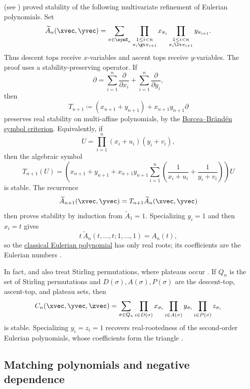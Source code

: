 \begin{example*}
\label{ex:stableMultivariateEulerianOperator}
 (see \cite[Thm. 2.5]{HaglundVisontai2012}) proved
stability of the following multivariate refinement of Eulerian polynomials.
Set
\[
 \widetilde A_n(\xvec,\yvec)
 =
 \sum_{\pi \in \symS_n}
 \prod_{\substack{1\leq i<n\\ \pi_i \gt \pi_{i+1}}} x_{\pi_i}
 \prod_{\substack{1\leq i<n\\ \pi_i \lt \pi_{i+1}}} y_{\pi_{i+1}}.
\]
Thus descent tops receive \(x\)-variables and ascent tops receive
\(y\)-variables.  The proof uses a stability-preserving operator.  If
\[
  \partial
  =
  \sum_{i=1}^n \frac{\partial}{\partial x_i}
  +
  \sum_{i=1}^n \frac{\partial}{\partial y_i},
\]
then
\[
  T_{n+1}
  \coloneqq
  (x_{n+1}+y_{n+1}) + x_{n+1}y_{n+1}\partial
\]
preserves real stability on multi-affine polynomials, by the
\hyperref[borceaBrandenFiniteSymbol]{Borcea--Brändén symbol criterion}.
Equivalently, if
\[
  U=\prod_{i=1}^n (x_i+u_i)(y_i+v_i),
\]
then the algebraic symbol
\[
  T_{n+1}(U)
  =
  \left(
    x_{n+1}+y_{n+1}
    +x_{n+1}y_{n+1}
    \sum_{i=1}^n
    \left(\frac{1}{x_i+u_i}+\frac{1}{y_i+v_i}\right)
  \right)U
\]
is stable.
The recurrence
\[
  \widetilde A_{n+1}(\xvec,\yvec)
  =
  T_{n+1}\widetilde A_n(\xvec,\yvec)
\]
then proves stability by induction from \(\widetilde A_1=1\).
Specializing \(y_i=1\) and then \(x_i=t\) gives
\[
  t\,\widetilde A_n(t,\dotsc,t;1,\dotsc,1)=A_n(t),
\]
so the \hyperref[eulerianZeros]{classical Eulerian polynomial} has only real
roots; its coefficients are the Eulerian numbers .

In fact,  and  also treat Stirling
permutations, where plateaus occur \cite{HaglundVisontai2012}.  If \(Q_n\) is
the set of Stirling permutations and \(D(\sigma),A(\sigma),P(\sigma)\) are the
descent-top, ascent-top, and plateau sets, then
\[
 C_n(\xvec,\yvec,\zvec)
 =
 \sum_{\sigma \in Q_n}
 \prod_{i\in D(\sigma)} x_{\sigma_i}
 \prod_{i\in A(\sigma)} y_{\sigma_i}
 \prod_{i\in P(\sigma)} z_{\sigma_i}
\]
is stable.  Specializing \(y_i=z_i=1\) recovers real-rootedness of the
second-order Eulerian polynomials, whose coefficients form the triangle
.
\end{example*}




\subsection[stableMatchingNegativeDependence]{Matching polynomials and negative dependence}

